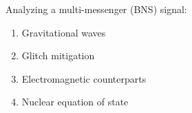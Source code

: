 \def\x{1mm}
\def\y{3mm}
Analyzing a multi-messenger \textbf{} (BNS) signal:
\begin{enumerate}
  \item Gravitational waves

  \vspace{\x}

  \item Glitch mitigation
  
  \vspace{\x}
  
  \item Electromagnetic counterparts
  
  \vspace{\x}
  
  \item Nuclear equation of state
\end{enumerate}

\vspace{\y}

\centering
{}